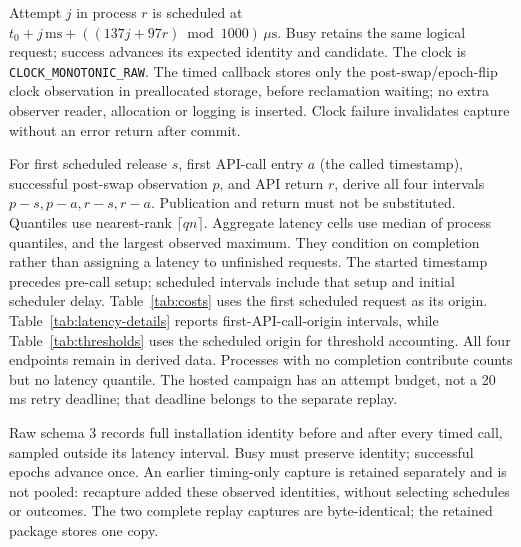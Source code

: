 Attempt $j$ in process $r$ is scheduled at $t_0+j\,\mathrm{ms}+((137j+97r)\bmod1000)\,\mu\mathrm{s}$. Busy retains the same logical request; success advances its expected identity and candidate. The clock is \texttt{CLOCK\_MONOTONIC\_RAW}. The timed callback stores only the post-swap/epoch-flip clock observation in preallocated storage, before reclamation waiting; no extra observer reader, allocation or logging is inserted. Clock failure invalidates capture without an error return after commit.

For first scheduled release $s$, first API-call entry $a$ (the called timestamp), successful post-swap observation $p$, and API return $r$, derive all four intervals $p-s,p-a,r-s,r-a$. Publication and return must not be substituted. Quantiles use nearest-rank $\lceil qn\rceil$. Aggregate latency cells use median of process quantiles, and the largest observed maximum. They condition on completion rather than assigning a latency to unfinished requests. The started timestamp precedes pre-call setup; scheduled intervals include that setup and initial scheduler delay. Table~\ref{tab:costs} uses the first scheduled request as its origin. Table~\ref{tab:latency-details} reports first-API-call-origin intervals, while Table~\ref{tab:thresholds} uses the scheduled origin for threshold accounting. All four endpoints remain in derived data. Processes with no completion contribute counts but no latency quantile. The hosted campaign has an attempt budget, not a 20\,ms retry deadline; that deadline belongs to the separate replay.

\begin{table}[!ht]
\caption{Hosted first-attempt latency distributions in $\mu$s. Each quartet is median/p95/p99/maximum, with the aggregation above. Counts are completed/started logical requests; unfinished requests remain censored.}
\label{tab:latency-details}
\centering\small

\end{table}

\begin{table}[!ht]
\caption{Scheduled-request publication threshold accounting, summed across processes. Each threshold cell is known met / known missed / unknown; its denominator is every logical request started. A censored request observed for less than the threshold remains unknown.}
\label{tab:thresholds}
\centering\small

\end{table}

Raw schema 3 records full installation identity before and after every timed call, sampled outside its latency interval. Busy must preserve identity; successful epochs advance once. An earlier timing-only capture is retained separately and is not pooled: recapture added these observed identities, without selecting schedules or outcomes. The two complete replay captures are byte-identical; the retained package stores one copy.

